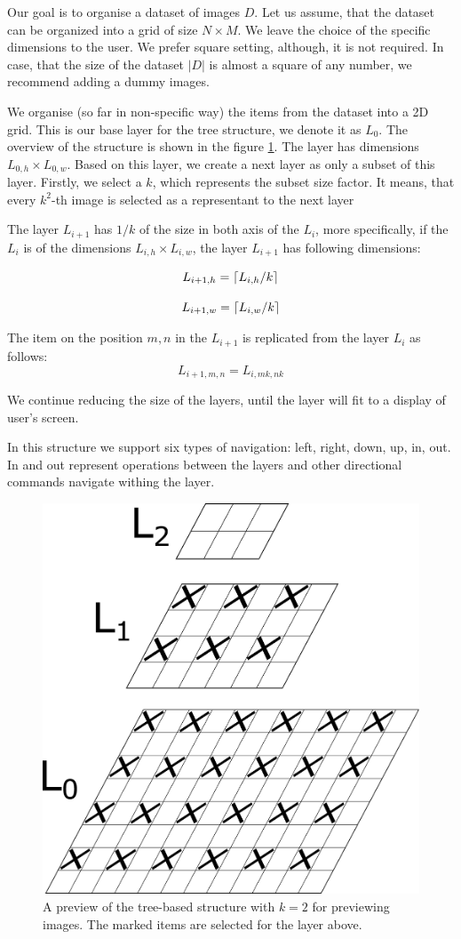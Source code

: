 Our goal is to organise a dataset of images $D$. Let us assume, that the dataset can be organized into a grid of size $N\times M$. We leave the choice of the specific dimensions to the user. We prefer square setting, although, it is not required. In case, that the size of the dataset $|D|$ is almost a square of any number, we recommend adding a dummy images.

We organise (so far in non-specific way) the items from the dataset into a 2D grid. This is our base layer for the tree structure, we denote it as $L_0$. The overview of the structure is shown in the figure \ref{fig:tree_structure}. The layer has dimensions $L_{0, h}\times L_{0, w}$. Based on this layer, we create a next layer as only a subset of this layer. Firstly, we select a $k$, which represents the subset size factor. It means, that every $k^2$-th image is selected as a representant to the next layer

The layer $L_{i+1}$ has $1/k$ of the size in both axis of the $L_i$, more specifically, if the $L_i$ is of the dimensions $L_{i,h} \times L_{i,w}$, the layer $L_{i+1}$ has following dimensions:

$$
    L_{i+1, h} = \ceil*{L_{i, h} / k}
$$

$$
    L_{i+1, w} = \ceil*{L_{i, w} / k}
$$


The item on the position $m, n$ in the $L_{i+1}$ is replicated from the layer $L_i$ as follows:
$$
    L_{i+1, m, n} = L_{i, mk, nk} 
$$

We continue reducing the size of the layers, until the layer will fit to a display of user's screen.

In this structure we support six types of navigation: left, right, down, up, in, out. In and out represent operations between the layers and other directional commands navigate withing the layer. 


\begin{figure}
    \centering
    \includegraphics[width=0.3\linewidth]{img/tree-structure.pdf}
    \caption{A preview of the tree-based structure with $k = 2$ for previewing images. The marked items are selected for the layer above.}
    \label{fig:tree_structure}
\end{figure}

